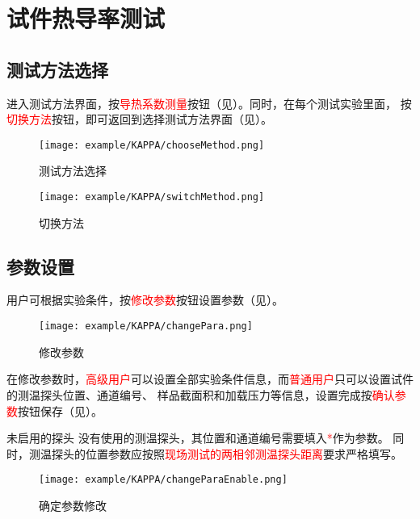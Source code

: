 \section{试件热导率测试}
\subsection{测试方法选择}
进入测试方法界面，按\textcolor{red}{导热系数测量}按钮（见）。同时，在每个测试实验里面，
按\textcolor{red}{切换方法}按钮，即可返回到选择测试方法界面（见）。
\begin{figure}[H]
	\centering
	\texttt{[image: example/KAPPA/chooseMethod.png]}
	\caption{ 测试方法选择 \label{fig:exmp_kappa_chooseMethod}}
\end{figure}

\begin{figure}[H]
	\centering
	\texttt{[image: example/KAPPA/switchMethod.png]}
	\caption{ 切换方法 \label{fig:exmp_kappa_switchMethod}}
\end{figure}

\subsection{参数设置}
用户可根据实验条件，按\textcolor{red}{修改参数}按钮设置参数（见）。
\begin{figure}[H]
	\centering
	\texttt{[image: example/KAPPA/changePara.png]}
	\caption{ 修改参数 \label{fig:exmp_kappa_changePara}}
\end{figure}
在修改参数时，\textcolor{red}{高级用户}可以设置全部实验条件信息，而\textcolor{red}{普通用户}只可以设置试件的测温探头位置、通道编号、
样品截面积和加载压力等信息，设置完成按\textcolor{red}{确认参数}按钮保存（见）。
\begin{tips}{未启用的探头}
没有使用的测温探头，其位置和通道编号需要填入\textcolor{red}{*}作为参数。
同时，测温探头的位置参数应按照\textcolor{red}{现场测试的两相邻测温探头距离}要求严格填写。
\end{tips}
\begin{figure}[H]
	\centering
	\texttt{[image: example/KAPPA/changeParaEnable.png]}
	\caption{ 确定参数修改 \label{fig:exmp_kappa_changeParaEnable}}
\end{figure}

